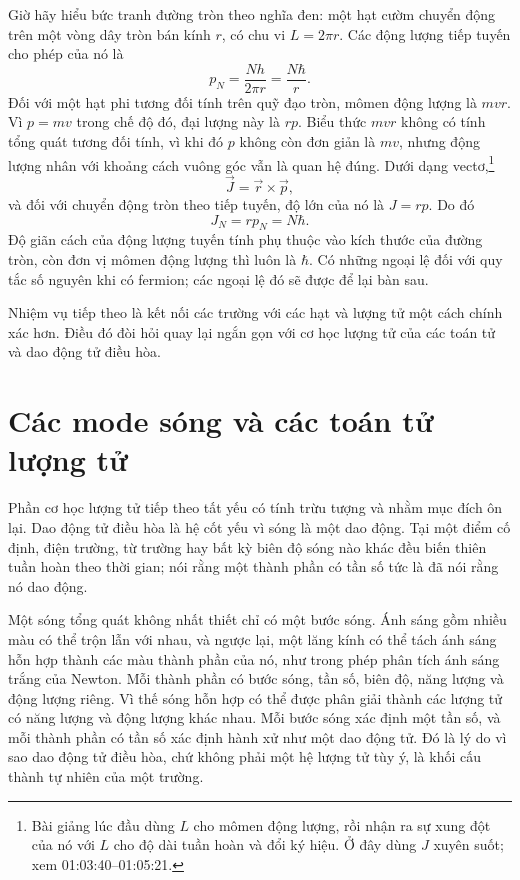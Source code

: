 Giờ hãy hiểu bức tranh đường tròn theo nghĩa đen: một hạt cườm chuyển động trên một vòng dây tròn bán kính \(r\), có chu vi \(L=2\pi r\). Các động lượng tiếp tuyến cho phép của nó là
\begin{equation}
p_N=\frac{Nh}{2\pi r}=\frac{N\hbar}{r}.
\end{equation}
Đối với một hạt phi tương đối tính trên quỹ đạo tròn, mômen động lượng là \(mvr\). Vì \(p=mv\) trong chế độ đó, đại lượng này là \(rp\). Biểu thức \(mvr\) không có tính tổng quát tương đối tính, vì khi đó \(p\) không còn đơn giản là \(mv\), nhưng động lượng nhân với khoảng cách vuông góc vẫn là quan hệ đúng. Dưới dạng vectơ,\footnote{Bài giảng lúc đầu dùng \(L\) cho mômen động lượng, rồi nhận ra sự xung đột của nó với \(L\) cho độ dài tuần hoàn và đổi ký hiệu. Ở đây dùng \(J\) xuyên suốt; xem 01:03:40--01:05:21.}
\begin{equation}
\vec J=\vec r\times\vec p,
\end{equation}
và đối với chuyển động tròn theo tiếp tuyến, độ lớn của nó là \(J=rp\). Do đó
\begin{equation}
J_N=rp_N=N\hbar.
\end{equation}
Độ giãn cách của động lượng tuyến tính phụ thuộc vào kích thước của đường tròn, còn đơn vị mômen động lượng thì luôn là \(\hbar\). Có những ngoại lệ đối với quy tắc số nguyên khi có fermion; các ngoại lệ đó sẽ được để lại bàn sau.

Nhiệm vụ tiếp theo là kết nối các trường với các hạt và lượng tử một cách chính xác hơn. Điều đó đòi hỏi quay lại ngắn gọn với cơ học lượng tử của các toán tử và dao động tử điều hòa.

\section{Các mode sóng và các toán tử lượng tử}

Phần cơ học lượng tử tiếp theo tất yếu có tính trừu tượng và nhằm mục đích ôn lại. Dao động tử điều hòa là hệ cốt yếu vì sóng là một dao động. Tại một điểm cố định, điện trường, từ trường hay bất kỳ biên độ sóng nào khác đều biến thiên tuần hoàn theo thời gian; nói rằng một thành phần có tần số tức là đã nói rằng nó dao động.

Một sóng tổng quát không nhất thiết chỉ có một bước sóng. Ánh sáng gồm nhiều màu có thể trộn lẫn với nhau, và ngược lại, một lăng kính có thể tách ánh sáng hỗn hợp thành các màu thành phần của nó, như trong phép phân tích ánh sáng trắng của Newton. Mỗi thành phần có bước sóng, tần số, biên độ, năng lượng và động lượng riêng. Vì thế sóng hỗn hợp có thể được phân giải thành các lượng tử có năng lượng và động lượng khác nhau. Mỗi bước sóng xác định một tần số, và mỗi thành phần có tần số xác định hành xử như một dao động tử. Đó là lý do vì sao dao động tử điều hòa, chứ không phải một hệ lượng tử tùy ý, là khối cấu thành tự nhiên của một trường.

